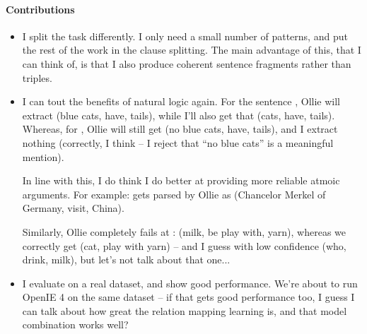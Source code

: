 \paragraph{Contributions}
\begin{itemize}
  \item I split the task differently. I only need a small number of
        patterns, and put the rest of the work in the clause splitting.
        The main advantage of this, that I can think of, is that I also
        produce coherent sentence fragments rather than triples.

  \item I can tout the benefits of natural logic again.
        For the sentence , Ollie will extract
        (blue cats, have, tails), while I'll also get that
        (cats, have, tails).
        Whereas, for , Ollie will still get
        (no blue cats, have, tails), and I extract nothing (correctly,
        I think -- I reject that ``no blue cats'' is a meaningful mention).

        In line with this, I do think I do better at providing more reliable
        atmoic arguments. For example:
         gets parsed
        by Ollie as (Chancelor Merkel of Germany, visit, China).

        Similarly, Ollie completely fails at 
        : 
        (milk, be play with, yarn), whereas we correctly get
        (cat, play with yarn) -- and I guess with low confidence
        (who, drink, milk), but let's not talk about that one...

  \item I evaluate on a real dataset, and show good performance.    
        We're about to run OpenIE 4 on the same dataset -- if that gets good
        performance too, I guess I can talk about how great the relation
        mapping learning is, and that model combination works well?
\end{itemize}


